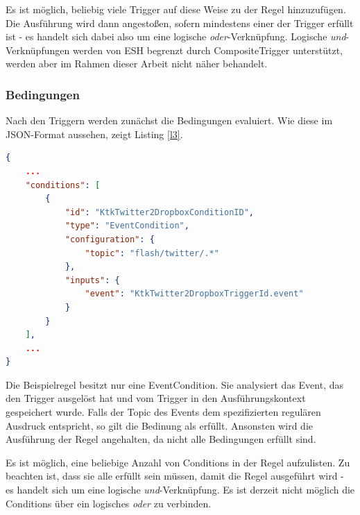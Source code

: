 Es ist möglich, beliebig viele Trigger auf diese Weise zu der Regel hinzuzufügen. Die Ausführung wird dann angestoßen, sofern mindestens einer der Trigger erfüllt ist - es handelt sich dabei also um eine logische \textit{oder}-Verknüpfung. Logische \textit{und}-Verknüpfungen werden von ESH begrenzt durch CompositeTrigger unterstützt, werden aber im Rahmen dieser Arbeit nicht näher behandelt.

\subsubsection{Bedingungen}
Nach den Triggern werden zunächst die Bedingungen evaluiert. Wie diese im JSON-Format aussehen, zeigt Listing \ref{l3}.
\begin{lstlisting}[language=json,firstnumber=1, caption=Die Liste der Conditions einer Regel im JSON Format, captionpos=b, label=l3]
{
    ...
    "conditions": [
        {
            "id": "KtkTwitter2DropboxConditionID",
            "type": "EventCondition",
            "configuration": {
                "topic": "flash/twitter/.*"
            },
            "inputs": {
                "event": "KtkTwitter2DropboxTriggerId.event"
            }           
        }
    ],
    ...
}                   
\end{lstlisting}
Die Beispielregel besitzt nur eine EventCondition. Sie analysiert das Event, das den Trigger ausgelöst hat und vom Trigger in den Ausführungskontext gespeichert wurde. Falls der Topic des Events dem spezifizierten regulären Ausdruck entspricht, so gilt die Bedinung als erfüllt. Ansonsten wird die Ausführung der Regel angehalten, da nicht alle Bedingungen erfüllt sind.

Es ist möglich, eine beliebige Anzahl von Conditions in der Regel aufzulisten. Zu beachten ist, dass sie alle erfüllt sein müssen, damit die Regel ausgeführt wird - es handelt sich um eine logische \textit{und}-Verknüpfung. Es ist derzeit nicht möglich die Conditions über ein logisches \textit{oder} zu verbinden.


